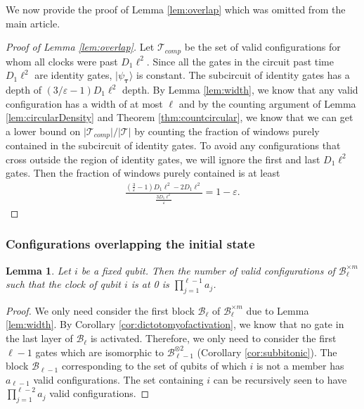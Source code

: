 \documentclass[11pt,letterpaper]{article}
\newtheorem{lemma}[theorem]{Lemma}
\theoremstyle{definition}
\theoremstyle{remark}
\newcommand{\abs}[1]{\lvert#1\rvert}
\newcommand{\cB}{\mathcal B}
\newcommand{\cT}{\mathcal T}
\let\epsilon=\varepsilon
\numberwithin{equation}{section}
\newcommand{\eps}{\epsilon}
\theoremstyle{definition}
\newcommand{\ket}[1]{|#1\rangle}
\newcommand{\timeconfig}{{\bm{\tau}}}
\begin{document}
We now provide the proof of Lemma \ref{lem:overlap} which was omitted from the main article.

\begin{proof}[Proof of Lemma \ref{lem:overlap}]
Let $\cT_{comp}$ be the set of valid configurations for whom all clocks were past $D_1 \ell^2$. Since all the gates in the circuit past time $D_1 \ell^2$ are identity gates, $\ket{\psi_\timeconfig}$ is constant. The subcircuit of identity gates has a depth of $(3/\eps - 1)D_1 \ell^2$ depth. By Lemma \ref{lem:width}, we know that any valid configuration has a width of at most $\ell$ and by the counting argument of Lemma \ref{lem:circularDensity} and Theorem \ref{thm:countcircular}, we know that we can get a lower bound on $\abs{\cT_{comp}}/\abs{\cT}$ by counting the fraction of windows purely contained in the subcircuit of identity gates. To avoid any configurations that cross outside the region of identity gates, we will ignore the first and last $D_1 \ell^2$ gates. Then the fraction of windows purely contained is at least
\begin{align}
\frac{\left(\frac{3}{\eps} - 1\right)D_1 \ell^2 - 2 D_1 \ell^2}{\frac{3 D_1 \ell^2}{\eps}} = 1 - \eps.
\end{align}
\end{proof}

\subsubsection{Configurations overlapping the initial state}

\begin{lemma}
Let $i$ be a fixed qubit. Then the number of valid configurations of $\cB_{\ell}^{\times m}$ such that the clock of qubit $i$ is at 0 is $\prod_{j = 1}^{\ell - 1} a_j$.
\end{lemma}

\begin{proof}
We only need consider the first block $\cB_\ell$ of $\cB_\ell^{\times m}$ due to Lemma \ref{lem:width}. By Corollary \ref{cor:dictotomyofactivation}, we know that no gate in the last layer of $\cB_\ell$ is activated. Therefore, we only need to consider the first $\ell - 1$ gates which are isomorphic to $\cB_{\ell - 1}^{\otimes 2}$ (Corollary \ref{cor:subbitonic}). The block $\cB_{\ell - 1}$ corresponding to the set of qubits of which $i$ is not a member has $a_{\ell - 1}$ valid configurations. The set containing $i$ can be recursively seen to have $\prod_{j = 1}^{\ell - 2} a_j$ valid configurations.
\end{proof}
\end{document}
